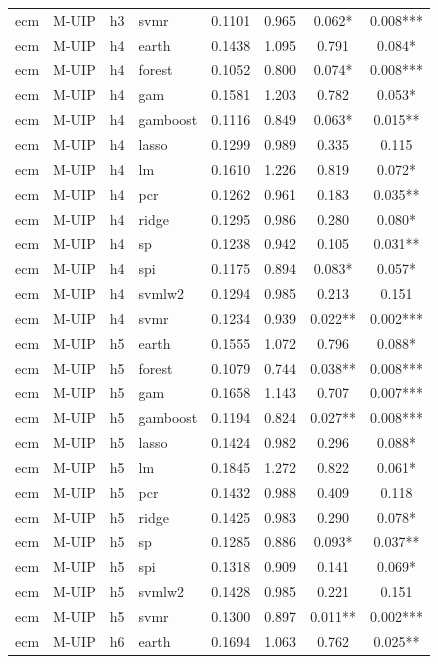 \begin{ThreePartTable}
\begin{longtable}[t]{llclcccc}
ecm & M-UIP & h3 & svmr & 0.1101 & 0.965 & 0.062* & 0.008***\\
\addlinespace
ecm & M-UIP & h4 & earth & 0.1438 & 1.095 & 0.791 & 0.084*\\
ecm & M-UIP & h4 & forest & 0.1052 & 0.800 & 0.074* & 0.008***\\
ecm & M-UIP & h4 & gam & 0.1581 & 1.203 & 0.782 & 0.053*\\
ecm & M-UIP & h4 & gamboost & 0.1116 & 0.849 & 0.063* & 0.015**\\
ecm & M-UIP & h4 & lasso & 0.1299 & 0.989 & 0.335 & 0.115\\
ecm & M-UIP & h4 & lm & 0.1610 & 1.226 & 0.819 & 0.072*\\
ecm & M-UIP & h4 & pcr & 0.1262 & 0.961 & 0.183 & 0.035**\\
ecm & M-UIP & h4 & ridge & 0.1295 & 0.986 & 0.280 & 0.080*\\
ecm & M-UIP & h4 & sp & 0.1238 & 0.942 & 0.105 & 0.031**\\
ecm & M-UIP & h4 & spi & 0.1175 & 0.894 & 0.083* & 0.057*\\
ecm & M-UIP & h4 & svmlw2 & 0.1294 & 0.985 & 0.213 & 0.151\\
ecm & M-UIP & h4 & svmr & 0.1234 & 0.939 & 0.022** & 0.002***\\
\addlinespace
ecm & M-UIP & h5 & earth & 0.1555 & 1.072 & 0.796 & 0.088*\\
ecm & M-UIP & h5 & forest & 0.1079 & 0.744 & 0.038** & 0.008***\\
ecm & M-UIP & h5 & gam & 0.1658 & 1.143 & 0.707 & 0.007***\\
ecm & M-UIP & h5 & gamboost & 0.1194 & 0.824 & 0.027** & 0.008***\\
ecm & M-UIP & h5 & lasso & 0.1424 & 0.982 & 0.296 & 0.088*\\
ecm & M-UIP & h5 & lm & 0.1845 & 1.272 & 0.822 & 0.061*\\
ecm & M-UIP & h5 & pcr & 0.1432 & 0.988 & 0.409 & 0.118\\
ecm & M-UIP & h5 & ridge & 0.1425 & 0.983 & 0.290 & 0.078*\\
ecm & M-UIP & h5 & sp & 0.1285 & 0.886 & 0.093* & 0.037**\\
ecm & M-UIP & h5 & spi & 0.1318 & 0.909 & 0.141 & 0.069*\\
ecm & M-UIP & h5 & svmlw2 & 0.1428 & 0.985 & 0.221 & 0.151\\
ecm & M-UIP & h5 & svmr & 0.1300 & 0.897 & 0.011** & 0.002***\\
\addlinespace
ecm & M-UIP & h6 & earth & 0.1694 & 1.063 & 0.762 & 0.025**\\

\end{longtable}
\end{ThreePartTable}
